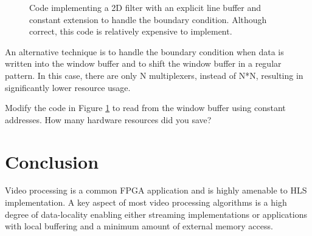 \begin{figure}

\caption{Code implementing a 2D filter with an explicit line buffer and constant extension to handle the boundary condition.   Although correct, this code is relatively expensive to implement.}\label{fig:video:boundaryConditionExtendBad}
\end{figure}

An alternative technique is to handle the boundary condition when data is written into the window buffer and to shift the window buffer in a regular pattern.  In this case, there are only N multiplexers, instead of N*N, resulting in significantly lower resource usage.  

\begin{exercise}
Modify the code in Figure \ref{fig:video:boundaryConditionExtendBad} to read from the window buffer using constant addresses.  How many hardware resources did you save?
\end{exercise}


\section{Conclusion}

Video processing is a common FPGA application and is highly amenable to HLS implementation.  A key aspect of most video processing algorithms is a high degree of data-locality enabling either streaming implementations or applications with local buffering and a minimum amount of external memory access.

